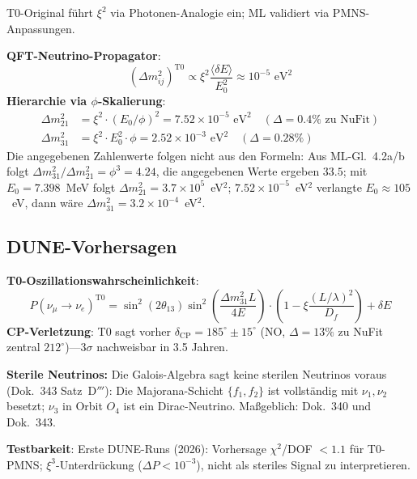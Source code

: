 	T0-Original führt $\xi^2$ via Photonen-Analogie ein; ML validiert via PMNS-Anpassungen.
	
	\textbf{QFT-Neutrino-Propagator}:
	\begin{equation}
		(\Delta m_{ij}^2)^{\text{T0}} \propto \xi^2 \frac{\langle\delta E\rangle}{E_0^2} \approx 10^{-5} \text{ eV}^2 \tag{ML-Gl.~4.1}
	\end{equation}
	\textbf{Hierarchie via $\phi$-Skalierung}:
	\begin{align}
		\Delta m_{21}^2 &= \xi^2 \cdot (E_0 / \phi)^2 = 7.52\times10^{-5} \text{ eV}^2 \quad (\Delta=0.4\% \text{ zu NuFit}) \tag{ML-Gl.~4.2a} \\
		\Delta m_{31}^2 &= \xi^2 \cdot E_0^2 \cdot \phi = 2.52\times10^{-3} \text{ eV}^2 \quad (\Delta=0.28\%) \tag{ML-Gl.~4.2b}
	\end{align}
	Die angegebenen Zahlenwerte folgen nicht aus den Formeln: Aus ML-Gl.~4.2a/b folgt $\Delta m_{31}^2/\Delta m_{21}^2 = \phi^3 = 4.24$, die angegebenen Werte ergeben $33.5$; mit $E_0 = 7.398$~MeV folgt $\Delta m_{21}^2 = 3.7\times10^{5}$~eV$^2$; $7.52\times10^{-5}$~eV$^2$ verlangte $E_0 \approx 105$~eV, dann wäre $\Delta m_{31}^2 = 3.2\times10^{-4}$~eV$^2$.
	
	\subsection{DUNE-Vorhersagen}
	
	\textbf{T0-Oszillationswahrscheinlichkeit}:
	\begin{equation}
		P(\nu_\mu \to \nu_e)^{\text{T0}} = \sin^2(2\theta_{13}) \sin^2\left(\frac{\Delta m_{31}^2 L}{4E}\right) \cdot \left(1 - \xi \frac{(L/\lambda)^2}{D_f}\right) + \delta E \tag{ML-Gl.~4.3}
	\end{equation}
	\textbf{CP-Verletzung}: T0 sagt vorher $\delta_{\text{CP}} = 185^\circ \pm 15^\circ$ (NO, $\Delta=13\%$ zu NuFit zentral $212^\circ$)—3$\sigma$ nachweisbar in 3.5 Jahren.
	
	
	
\textbf{Sterile Neutrinos:} Die Galois-Algebra sagt keine sterilen Neutrinos voraus (Dok.~343 Satz~D$'''$): Die Majorana-Schicht
$\{f_1,f_2\}$ ist vollständig mit $\nu_1,\nu_2$ besetzt; $\nu_3$ in Orbit $O_4$
ist ein Dirac-Neutrino. Maßgeblich: Dok.~340 und Dok.~343.

\textbf{Testbarkeit}: Erste DUNE-Runs (2026): Vorhersage $\chi^2$/DOF $<1.1$ für T0-PMNS; $\xi^3$-Unterdrückung ($\Delta P<10^{-3}$), nicht als steriles Signal zu interpretieren.
	

